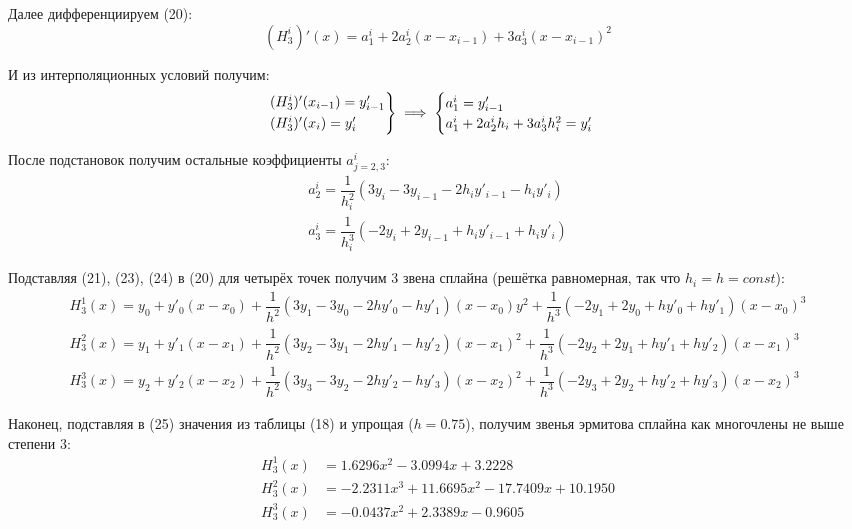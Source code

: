 Далее дифференциируем (20):
\begin{equation}
    (H_3^i)'(x) = a_1^i + 2a_2^i(x-x_{i-1})+3a_3^i(x-x_{i-1})^2
\end{equation}

И из интерполяционных условий получим:
\begin{equation}
    \begin{rcases}
        (H_3^i)'(x_{i-1}) = y'_{i-1} \\
        (H_3^i)'(x_i) = y'_i
    \end{rcases} \implies
    \begin{cases}
        a_1^i = y'_{i-1} \\
        a_1^i + 2a_2^ih_i + 3a_3^ih_i^2 = y'_i
    \end{cases}
\end{equation}

После подстановок получим остальные коэффициенты $a_{j=2,3}^i$:
\begin{equation}
    \begin{matrix}
        a_2^i = \dfrac{1}{h_i^2}(3y_i - 3y_{i-1} - 2h_iy'_{i-1} - h_iy'_i)\\
        a_3^i = \dfrac{1}{h_i^3}(-2y_i + 2y_{i-1} + h_iy'_{i-1} + h_iy'_i)
    \end{matrix}
\end{equation}

Подставляя (21), (23), (24) в (20) для четырёх точек получим 3 звена сплайна (решётка равномерная, так что $h_i=h=const$):
\begin{equation}
    \begin{matrix}
        H_3^1(x) = y_0 + y'_0(x-x_0) +
        \dfrac{1}{h^2}(3y_1 - 3y_0 - 2hy'_0 - hy'_1)(x-x_0)y^2 +
        \dfrac{1}{h^3}(-2y_1 + 2y_0 + hy'_0 + hy'_1)(x-x_0)^3\\
        H_3^2(x) = y_1 + y'_1(x-x_1) +
        \dfrac{1}{h^2}(3y_2 - 3y_1 - 2hy'_1 - hy'_2)(x-x_1)^2 +
        \dfrac{1}{h^3}(-2y_2 + 2y_1 + hy'_1 + hy'_2)(x-x_1)^3\\
        H_3^3(x) = y_2 + y'_2(x-x_2) +
        \dfrac{1}{h^2}(3y_3 - 3y_2 - 2hy'_2 - hy'_3)(x-x_2)^2 +
        \dfrac{1}{h^3}(-2y_3 + 2y_2 + hy'_2 + hy'_3)(x-x_2)^3
    \end{matrix}
\end{equation}

Наконец, подставляя в (25) значения из таблицы (18) и упрощая ($h = 0.75$), получим звенья эрмитова сплайна как многочлены не выше степени 3:
\begin{align}
    H_3^1(x) &= 1.6296x^2 - 3.0994x + 3.2228\\
    H_3^2(x) &= -2.2311x^3 + 11.6695x^2 - 17.7409x + 10.1950\\
    H_3^3(x) &= -0.0437x^2 + 2.3389x - 0.9605
\end{align}

